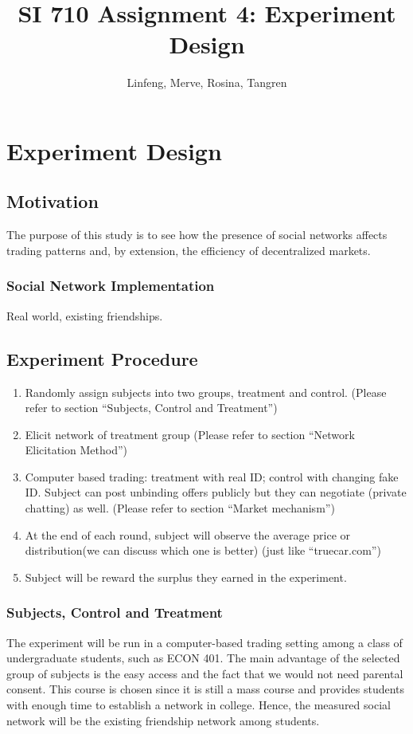 \documentclass{article}
\title{SI 710 Assignment 4: Experiment Design}
\author{Linfeng, Merve, Rosina, Tangren}
\date{}
\begin{document}
\maketitle
\tableofcontents
%

\section{Experiment Design}
\subsection{Motivation}
The purpose of this study is to see how the presence of social networks affects
trading patterns and, by extension, the efficiency of decentralized markets.


\subsubsection{Social Network Implementation}
Real world, existing friendships.

\subsection{Experiment Procedure}
\begin{enumerate}
    \item Randomly assign subjects into two groups, treatment and control.
        (Please refer to section ``Subjects, Control and Treatment'')
    \item Elicit network of treatment group (Please refer to section ``Network
        Elicitation Method'')
    \item Computer based trading: treatment with real ID; control with changing
        fake ID. Subject can post unbinding offers publicly but they can
        negotiate (private chatting) as well. (Please refer to section ``Market
        mechanism'')
    \item At the end of each round, subject will observe the average price or
        distribution(we can discuss which one is better) (just like
        ``truecar.com'')
    \item Subject will be reward the surplus they earned in the experiment.
\end{enumerate}

\subsubsection{Subjects, Control and Treatment}
The experiment will be run in a computer-based trading setting among a class of
undergraduate students, such as ECON 401. The main advantage of the selected
group of subjects is the easy access and the fact that we would not need
parental consent. This course is chosen since it is still a mass course and
provides students with enough time to establish a network in college. Hence, the
measured social network will be the existing friendship network among students.
\end{document}
